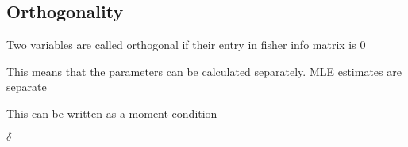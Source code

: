 
\subsection{Orthogonality}

Two variables are called orthogonal if their entry in fisher info matrix is 0

This means that the parameters can be calculated separately. MLE estimates are separate

This can be written as a moment condition

\(\delta \)

